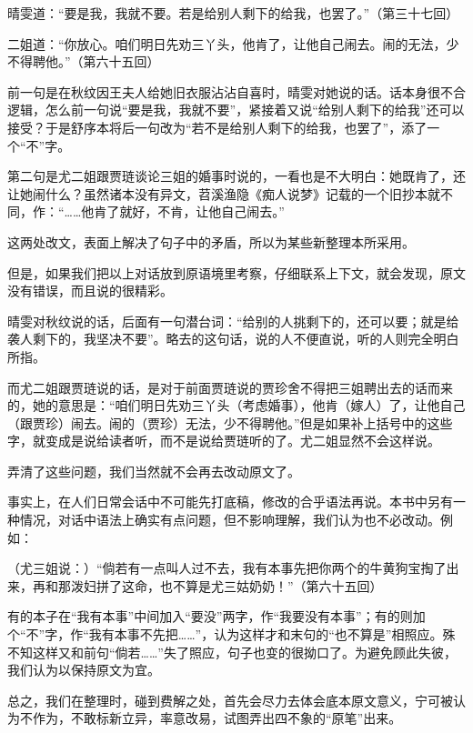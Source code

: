 晴雯道：“要是我，我就不要。若是给别人剩下的给我，也罢了。”（第三十七回）

二姐道：“你放心。咱们明日先劝三丫头，他肯了，让他自己闹去。闹的无法，少不得聘他。”（第六十五回）

前一句是在秋纹因王夫人给她旧衣服沾沾自喜时，晴雯对她说的话。话本身很不合逻辑，怎么前一句说“要是我，我就不要”，紧接着又说“给别人剩下的给我”还可以接受？于是舒序本将后一句改为“若{不}是给别人剩下的给我，也罢了”，添了一个“不”字。

第二句是尤二姐跟贾琏谈论三姐的婚事时说的，一看也是不大明白：她既肯了，还让她闹什么？虽然诸本没有异文，苕溪渔隐《痴人说梦》记载的一个旧抄本就不同，作：“\ldots{}\ldots{}他肯了{就好，不肯}，让他自己闹去。”

这两处改文，表面上解决了句子中的矛盾，所以为某些新整理本所采用。

但是，如果我们把以上对话放到原语境里考察，仔细联系上下文，就会发现，原文没有错误，而且说的很精彩。

晴雯对秋纹说的话，后面有一句潜台词：“给别的人挑剩下的，还可以要；就是给袭人剩下的，我坚决不要”。略去的这句话，说的人不便直说，听的人则完全明白所指。

而尤二姐跟贾琏说的话，是对于前面贾琏说的贾珍舍不得把三姐聘出去的话而来的，她的意思是：“咱们明日先劝三丫头（考虑婚事），他肯（嫁人）了，让他自己（跟贾珍）闹去。闹的（贾珍）无法，少不得聘他。”但是如果补上括号中的这些字，就变成是说给读者听，而不是说给贾琏听的了。尤二姐显然不会这样说。

弄清了这些问题，我们当然就不会再去改动原文了。

事实上，在人们日常会话中不可能先打底稿，修改的合乎语法再说。本书中另有一种情况，对话中语法上确实有点问题，但不影响理解，我们认为也不必改动。例如：

（尤三姐说：）“倘若有一点叫人过不去，我有本事先把你两个的牛黄狗宝掏了出来，再和那泼妇拼了这命，也不算是尤三姑奶奶！”（第六十五回）

有的本子在“我有本事”中间加入“要没”两字，作“我要没有本事”；有的则加个“不”字，作“我有本事不先把\ldots{}\ldots{}”，认为这样才和末句的“也不算是”相照应。殊不知这样又和前句“倘若\ldots{}\ldots{}”失了照应，句子也变的很拗口了。为避免顾此失彼，我们认为以保持原文为宜。

总之，我们在整理时，碰到费解之处，首先会尽力去体会底本原文意义，宁可被认为不作为，不敢标新立异，率意改易，试图弄出四不象的“原笔”出来。

{}

